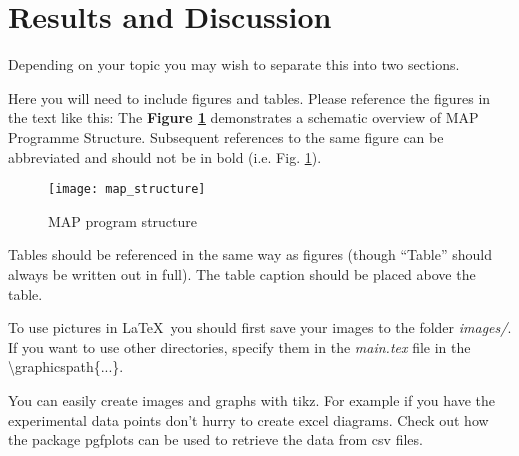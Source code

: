 \section{Results and Discussion}
Depending on your topic you may wish to separate this into two sections.

Here you will need to include figures and tables. Please reference the figures in the text like this: The \textbf{Figure \ref{map_struct}} demonstrates a schematic overview of MAP Programme Structure. Subsequent references to the same figure can be abbreviated and should not be in bold (i.e. Fig. \ref{map_struct}).

\begin{figure}
	\centering
	\texttt{[image: map\_structure]}
	\caption{MAP program structure\cite{map_web}}
	\label{map_struct}
\end{figure}

Tables should be referenced in the same way as figures (though “Table” should always be written out in full). The table caption should be placed above the table.
 
To use pictures in \LaTeX \ you should first save your images to the folder \textit{images/}. If you want to use other directories, specify them in the \textit{main.tex} file in the \textbackslash graphicspath\{...\}.
 
You can easily create images and graphs with tikz. For example if you have the experimental data points don't hurry to create excel diagrams. Check out how the package pgfplots can be used to retrieve the data from csv files.
